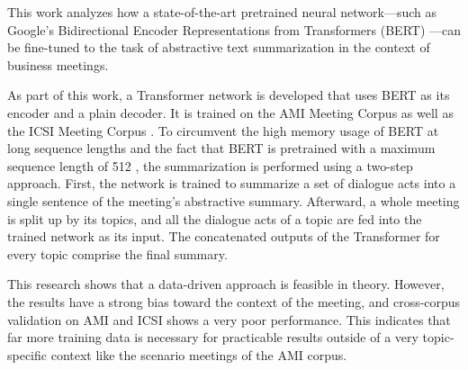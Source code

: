 This work analyzes how a state-of-the-art pretrained neural network---such as Google's Bidirectional Encoder Representations from Transformers (BERT) \cite{devlin2018bert}---can be fine-tuned to the task of abstractive text summarization in the context of business meetings. %

As part of this work, a Transformer network \cite{1706.03762} is developed that uses BERT as its encoder and a plain decoder.
It is trained on the AMI Meeting Corpus \cite{Mccowan05theami} as well as the ICSI Meeting Corpus \cite{Janin}.
To circumvent the high memory usage of BERT at long sequence lengths and the fact that BERT is pretrained with a maximum sequence length of 512 \cite[p.~13]{devlin2018bert}, the summarization is performed using a two-step approach.
First, the network is trained to summarize a set of dialogue acts into a single sentence of the meeting's abstractive summary.
Afterward, a whole meeting is split up by its topics, and all the dialogue acts of a topic are fed into the trained network as its input.
The concatenated outputs of the Transformer for every topic comprise the final summary.

This research shows that a data-driven approach is feasible in theory.
However, the results have a strong bias toward the context of the meeting, and cross-corpus validation on AMI and ICSI shows a very poor performance.
This indicates that far more training data is necessary for practicable results outside of a very topic-specific context like the scenario meetings of the AMI corpus. 
